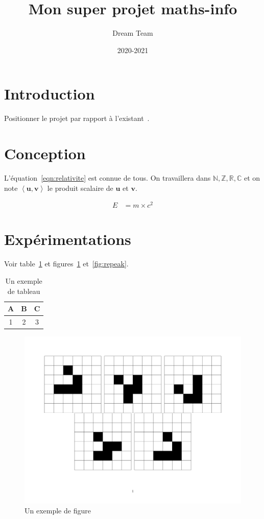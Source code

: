 \documentclass[11pt,a4paper]{article}
\title{Mon super projet maths-info}
\author{Dream Team}
\date{2020-2021}
\def\energie{E}
\def\masse{m}
\def\vitesse{c}
\def\setN{\mathbb{N}}
\def\setZ{\mathbb{Z}}
\def\setR{\mathbb{R}}
\def\setC{\mathbb{C}}
\newcommand{\pscalaire}[2]{\left < #1, #2 \right >}
\begin{document}
\maketitle


\tableofcontents
\clearpage
\section{Introduction}

\lipsum[2-4]

Positionner le projet par rapport à l'existant~\cite{Pedregosa2011Scikit, Rahimi2008Random}.

\section{Conception}
\lipsum[5]

L'équation~\eqref{eqn:relativite} est connue de tous. On travaillera dans $\setN, \setZ, \setR, \setC$ et on note $\pscalaire{\mathbf{u}}{\mathbf{v}}$ le produit scalaire de $\mathbf{u}$ et $\mathbf{v}$.

\begin{align}
\energie & = \masse \times \vitesse^2
\label{eqn:relativite}
\end{align}

\section{Expérimentations}
\lipsum[6]

Voir table~\ref{tab:exemple} et figures~\ref{fig:gol} et~\ref{fig:repeak}.

\begin{table}[tbh]
\centering
\begin{tabular}{|c|c|c|}
\hline
A & B & C\\
\hline
1 & 2 & 3\\
\hline
\end{tabular}
\caption{\label{tab:exemple} Un exemple de tableau}
\end{table}

\lipsum[7]

\begin{figure}[tbh]
\centering
\includegraphics[width=.8\textwidth]{gol_image}
\caption{\label{fig:gol} Un exemple de figure}
\end{figure}
\end{document}
